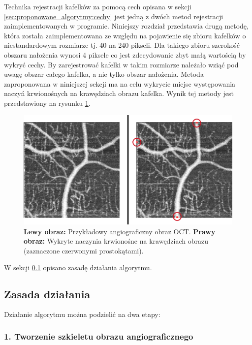 Technika rejestracji kafelków za pomocą cech opisana w sekcji \ref{sec:proponowane_algorytmy:cechy} jest jedną z dwóch metod rejestracji zaimplementowanych w programie. Niniejszy rozdział przedstawia drugą metodę, która została zaimplementowana ze względu na pojawienie się zbioru kafelków o niestandardowym rozmiarze tj. 40 na 240 pikseli. Dla takiego zbioru szerokość obszaru nałożenia wynosi 4 piksele co jest zdecydowanie zbyt małą wartością by wykryć cechy. By zarejestrować kafelki w takim rozmiarze należało wziąć pod uwagę obszar całego kafelka, a nie tylko obszar nałożenia. Metoda zaproponowana w niniejszej sekcji ma na celu wykrycie miejsc występowania naczyń krwionośnych na krawędziach obrazu kafelka. Wynik tej metody jest przedstawiony na rysunku \ref{fig:proponowane_algorytmy:paths_detected}.

\begin{figure}[htb]
  \centering
  \includegraphics[width=\textwidth]{gfx/paths_detected}
  \caption{\textbf{Lewy obraz:} Przykładowy angiograficzny obraz OCT. \textbf{Prawy obraz:} Wykryte naczynia krwionośne na krawędziach obrazu (zaznaczone czerwonymi prostokątami).}
  \label{fig:proponowane_algorytmy:paths_detected}
\end{figure}

W sekcji \ref{sec:proponowane_algorytmy:zasada_dzialania} opisano zasadę działania algorytmu.

\subsection{Zasada działania}
\label{sec:proponowane_algorytmy:zasada_dzialania}

Działanie algorytmu można podzielić na dwa etapy:

\subsubsection{1. Tworzenie szkieletu obrazu angiograficznego}

